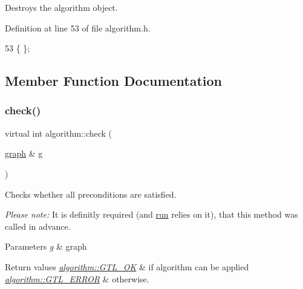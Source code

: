 Destroys the algorithm object. 



Definition at line 53 of file algorithm.\+h.


\begin{DoxyCode}
53 \{ \};    
\end{DoxyCode}


\subsection{Member Function Documentation}
\mbox{\label{classalgorithm_a76361fb03ad1cf643affc51821e43bed}} 
\subsubsection{\texorpdfstring{check()}{check()}}
{\footnotesize\ttfamily virtual int algorithm\+::check (\begin{DoxyParamCaption}\item[{\mbox{\hyperlink{classgraph}{graph}} \&}]{g }\end{DoxyParamCaption})\hspace{0.3cm}{\ttfamily [pure virtual]}}



Checks whether all preconditions are satisfied. 

{\itshape Please} {\itshape note\+:} It is definitly required (and \mbox{\hyperlink{classalgorithm_a734b189509a8d6b56b65f8ff772d43ca}{run}} relies on it), that this method was called in advance.


\begin{DoxyParams}{Parameters}
{\em g} & graph \\
\hline
\end{DoxyParams}

\begin{DoxyRetVals}{Return values}
{\em \mbox{\hyperlink{classalgorithm_af1a0078e153aa99c24f9bdf0d97f6710a5114c20e4a96a76b5de9f28bf15e282b}{algorithm\+::\+G\+T\+L\+\_\+\+OK}}} & if algorithm can be applied \\
\hline
{\em \mbox{\hyperlink{classalgorithm_af1a0078e153aa99c24f9bdf0d97f6710a6fcf574690bbd6cf710837a169510dd7}{algorithm\+::\+G\+T\+L\+\_\+\+E\+R\+R\+OR}}} & otherwise. \\
\hline
\end{DoxyRetVals}


